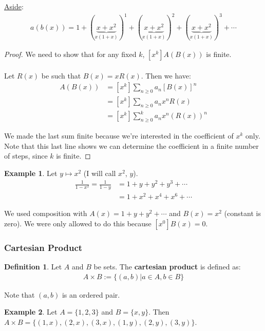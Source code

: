 \documentclass[]{article}
\theoremstyle{definition}
\newtheorem{defn}{Definition}[section]
\newtheorem{ex}{Example}[section]
\begin{document}
				\underline{Aside}:
				\begin{align*}
					a(b(x)) = 1 + (\underbrace{x + x^2}_{x(1+x)})^1 + (\underbrace{x + x^2}_{x(1+x)})^2 + (\underbrace{x + x^2}_{x(1+x)})^3 + \cdots
				\end{align*}

				\begin{proof}
					We need to show that for any fixed $k$, $[x^k]A(B(x))$ is finite.
					\\ \\
					Let $R(x)$ be such that $B(x) = xR(x)$. Then we have:
					\begin{align*}
						[x^k]A(B(x)) &= [x^k] \sum_{n \ge 0} a_n[B(x)]^n \\
						&= [x^k] \sum_{n \ge 0} a_n x^n R(x) \\
						&= [x^k] \sum_{n \ge 0}^{k} a_n x^n (R(x))^n
					\end{align*}

					We made the last sum finite because we're interested in the coefficient of $x^k$ only. Note that this last line shows we can determine the coefficient in a finite number of steps, since $k$ is finite.
				\end{proof}

				\begin{ex}
					Let $y \mapsto x^2$ (I will call $x^2$, $y$).
					\begin{align*}
						\frac{1}{1 - x^2} = \frac{1}{1 - y} &= 1 + y + y^2 + y^3 + \cdots \\
					&= 1 + x^2 + x^4 + x^6 + \cdots
					\end{align*}

					We used composition with $A(x) = 1 + y + y^2 + \cdots$ and $B(x) = x^2$ (constant is zero). We were only allowed to do this because $[x^0]B(x) = 0$.
				\end{ex}
			\subsubsection{Cartesian Product}
				\begin{defn}
					Let $A$ and $B$ be sets. The \textbf{cartesian product} is defined as:
					\begin{align*}
						A \times B := \{ (a, b) \big| a \in A, b \in B \}
					\end{align*}

					Note that $(a, b)$ is an ordered pair.
				\end{defn}

				\begin{ex}
					Let $A = \{1, 2, 3\}$ and $B = \{x, y\}$. Then $A \times B = \{ (1, x), (2, x), (3, x), (1, y), (2, y), (3, y) \}$.
				\end{ex}
\end{document}
